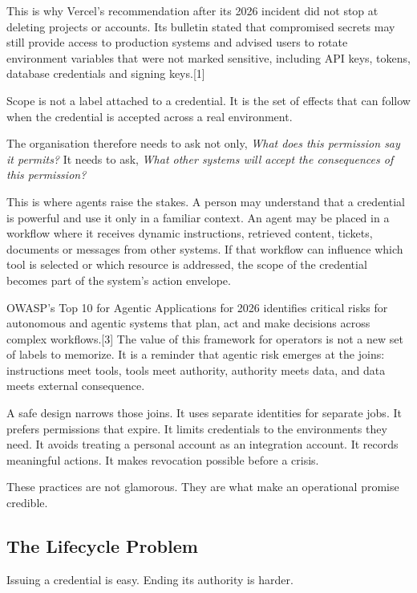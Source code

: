 This is why Vercel's recommendation after its 2026 incident did not stop
at deleting projects or accounts. Its bulletin stated that compromised
secrets may still provide access to production systems and advised users
to rotate environment variables that were not marked sensitive,
including API keys, tokens, database credentials and signing
keys.{[}1{]}

Scope is not a label attached to a credential. It is the set of effects
that can follow when the credential is accepted across a real
environment.

The organisation therefore needs to ask not only, \emph{What does this
permission say it permits?} It needs to ask, \emph{What other systems
will accept the consequences of this permission?}

This is where agents raise the stakes. A person may understand that a
credential is powerful and use it only in a familiar context. An agent
may be placed in a workflow where it receives dynamic instructions,
retrieved content, tickets, documents or messages from other systems. If
that workflow can influence which tool is selected or which resource is
addressed, the scope of the credential becomes part of the system's
action envelope.

OWASP's Top 10 for Agentic Applications for 2026 identifies critical
risks for autonomous and agentic systems that plan, act and make
decisions across complex workflows.{[}3{]} The value of this framework
for operators is not a new set of labels to memorize. It is a reminder
that agentic risk emerges at the joins: instructions meet tools, tools
meet authority, authority meets data, and data meets external
consequence.

A safe design narrows those joins. It uses separate identities for
separate jobs. It prefers permissions that expire. It limits credentials
to the environments they need. It avoids treating a personal account as
an integration account. It records meaningful actions. It makes
revocation possible before a crisis.

These practices are not glamorous. They are what make an operational
promise credible.

\subsection{The Lifecycle Problem}\label{the-lifecycle-problem}

Issuing a credential is easy. Ending its authority is harder.

